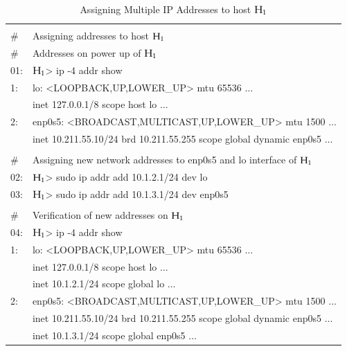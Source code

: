 \begin{table}[H]
\caption{Assigning Multiple IP Addresses to host ${\rm H}_{1}$}\label{chap2-table-4}
\begin{center}
\begin{tabular}{|l@{\;}l|}
\hline
   & \\[-.8em] 
\# & Assigning addresses to host ${\rm H}_{1}$\\
\# & Addresses on power up of ${\rm H}_{1}$\\
01:& ${\rm H}_{1}$> ip -4 addr show\\
1: & lo: <LOOPBACK,UP,LOWER\_UP> mtu 65536 $\ldots$\\
   & \quad inet 127.0.0.1/8 scope host lo $\ldots$\\
2: & enp0s5: <BROADCAST,MULTICAST,UP,LOWER\_UP> mtu 1500 $\ldots$\\
   & \quad inet 10.211.55.10/24 brd 10.211.55.255 scope global dynamic enp0s5 $\ldots$\\[.1cm]
   \hline
   & \\[-.8em] 
\# & Assigning new network addresses to enp0s5 and lo interface of ${\rm H}_{1}$\\
02:& ${\rm H}_{1}$> sudo ip addr add 10.1.2.1/24 dev lo\\
03:& ${\rm H}_{1}$> sudo ip addr add 10.1.3.1/24 dev enp0s5\\[.1cm]
\hline
   & \\[-.8em] 
\# & Verification of new addresses on ${\rm H}_{1}$\\
04:& ${\rm H}_{1}$> ip -4 addr show\\
1: & lo: <LOOPBACK,UP,LOWER\_UP> mtu 65536 $\ldots$\\
   &\quad inet 127.0.0.1/8 scope host lo $\ldots$\\
   & \quad inet 10.1.2.1/24 scope global lo $\ldots$\\
2: & enp0s5: <BROADCAST,MULTICAST,UP,LOWER\_UP> mtu 1500 $\ldots$\\
   & \quad inet 10.211.55.10/24 brd 10.211.55.255 scope global dynamic enp0s5 $\ldots$\\
   &\quad inet 10.1.3.1/24 scope global enp0s5 $\ldots$\\[.1cm]
   \hline   
\end{tabular}
\end{center}
\end{table}

\vspace{-1.9cm}

